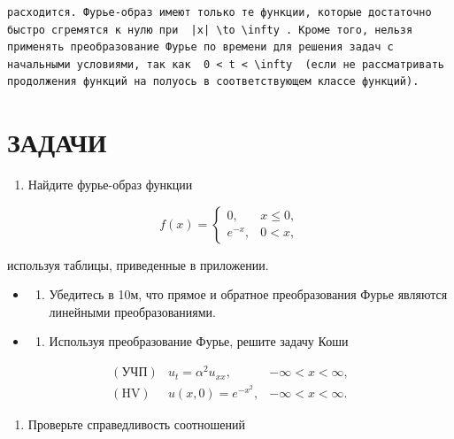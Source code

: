\documentclass[
  ukrainian,
]{article}
\providecommand{\tightlist}{%
  \setlength{\itemsep}{0pt}\setlength{\parskip}{0pt}}
\begin{document}
\begin{verbatim}
расходится. Фурье-образ имеют только те функции, которые достаточно быстро сгремятся к нулю при  |x| \to \infty . Кроме того, нельзя применять преобразование Фурье по времени для решения задач с начальными условиями, так как  0 < t < \infty  (если не рассматривать продолжения функций на полуось в соответствующем классе функций).
\end{verbatim}

\section{ЗАДАЧИ}\label{ux437ux430ux434ux430ux447ux438-1}

\begin{enumerate}
\def\labelenumi{\arabic{enumi}.}
\tightlist
\item
  Найдите фурье-образ функции
\end{enumerate}

\[
f(x) =
\begin{cases} 0, & x \leq 0, \\ e^{-x}, & 0 < x, \end{cases}
\]

используя таблицы, приведенные в приложении.

\begin{itemize}
\tightlist
\item
  \begin{enumerate}
  \def\labelenumi{\arabic{enumi}.}
  \setcounter{enumi}{1}
  \tightlist
  \item
    Убедитесь в 10м, что прямое и обратное преобразования Фурье являются
    линейными преобразованиями.
  \end{enumerate}
\item
  \begin{enumerate}
  \def\labelenumi{\arabic{enumi}.}
  \setcounter{enumi}{2}
  \tightlist
  \item
    Используя преобразование Фурье, решите задачу Коши
  \end{enumerate}
\end{itemize}

\[
\begin{array}{lll} (\text{УЧП}) & u_t = \alpha^2 u_{xx}, & -\infty < x < \infty, \\ (\text{HV}) & u(x, 0) = e^{-x^2}, & -\infty < x < \infty. \end{array}
\]

\begin{enumerate}
\def\labelenumi{\arabic{enumi}.}
\setcounter{enumi}{3}
\tightlist
\item
  Проверьте справедливость соотношений
\end{enumerate}
\end{document}
